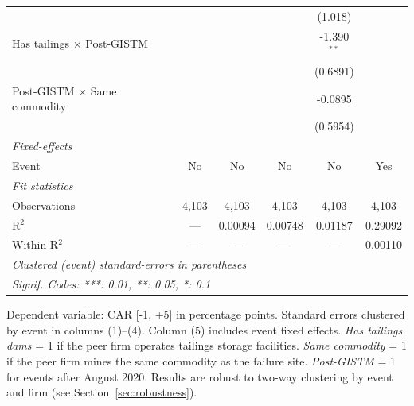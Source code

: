 \begin{table}[htbp]
\begin{tabular}{lccccc}
                                                           &          &                &                & (1.018)       &   \\
      Has tailings $\times$ Post-GISTM                     &          &                &                & -1.390$^{**}$ &   \\
                                                           &          &                &                & (0.6891)      &   \\
      Post-GISTM $\times$ Same commodity                   &          &                &                & -0.0895       &   \\
                                                           &          &                &                & (0.5954)      &   \\
      \midrule
      \emph{Fixed-effects}\\
      Event                                                & No       & No             & No             & No            & Yes\\
      \midrule
      \emph{Fit statistics}\\
      Observations                                         & 4,103    & 4,103          & 4,103          & 4,103         & 4,103\\
      R$^2$                                                & ---      & 0.00094        & 0.00748        & 0.01187       & 0.29092\\
      Within R$^2$                                         & ---      & ---            & ---            & ---           & 0.00110\\
      \midrule \midrule
      \multicolumn{6}{l}{\emph{Clustered (event) standard-errors in parentheses}}\\
      \multicolumn{6}{l}{\emph{Signif. Codes: ***: 0.01, **: 0.05, *: 0.1}}\\
   \end{tabular}

   \par \raggedright
   Dependent variable: CAR [-1, +5] in percentage points. Standard errors clustered by event in columns (1)--(4). Column (5) includes event fixed effects. \textit{Has tailings dams} = 1 if the peer firm operates tailings storage facilities. \textit{Same commodity} = 1 if the peer firm mines the same commodity as the failure site. \textit{Post-GISTM} = 1 for events after August 2020. Results are robust to two-way clustering by event and firm (see Section~\ref{sec:robustness}).
\end{table}
